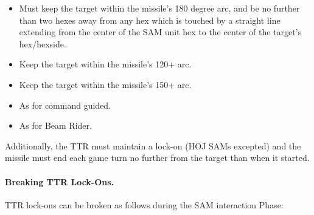 \begin{itemize}
    \item{} Must keep the target within the missile's 180 degree arc, and be no further than two hexes away from any hex which is touched by a straight line extending from the center of the SAM unit hex to the center of the target's hex/hexside.

    \item{} Keep the target within the missile's 120+ arc.

    \item{} Keep the target within the missile's 150+ arc.

    \item{} As for command guided.

    \item{} As for Beam Rider.
\end{itemize}

Additionally, the TTR must maintain a lock-on (HOJ SAMs excepted) and the missile must end each game turn no further from the target than when it started.

\paragraph{Breaking TTR Lock-Ons.} 

TTR lock-ons can be broken as follows during the SAM interaction Phase:

